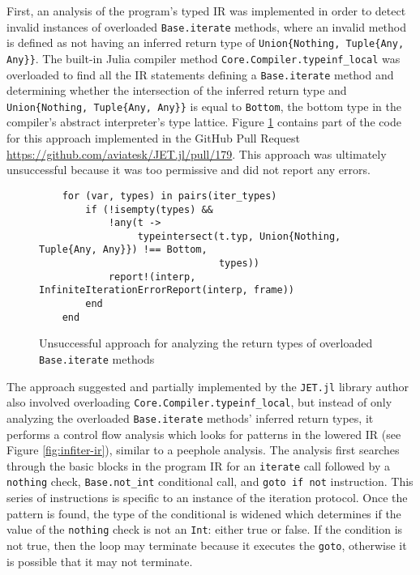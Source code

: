 \documentclass[manuscript, nonacm]{acmart}
\begin{document}
First, an analysis of the program's typed IR was implemented in order to detect invalid instances of overloaded \texttt{Base.iterate} methods, where an invalid method is defined as not having an inferred return type of \verb|Union{Nothing, Tuple{Any, Any}}|. The built-in Julia compiler method \verb|Core.Compiler.typeinf_local| was overloaded to find all the IR statements defining a \texttt{Base.iterate} method and determining whether the intersection of the inferred return type and \verb|Union{Nothing, Tuple{Any, Any}}| is equal to \texttt{Bottom}, the bottom type in the compiler's abstract interpreter's type lattice. Figure \ref{fig:try1} contains part of the code for this approach implemented in the GitHub Pull Request \url{https://github.com/aviatesk/JET.jl/pull/179}. This approach was ultimately unsuccessful because it was too permissive and did not report any errors.

\begin{figure}
    \begin{verbatim}
    for (var, types) in pairs(iter_types)
        if (!isempty(types) &&
            !any(t ->
                 typeintersect(t.typ, Union{Nothing, Tuple{Any, Any}}) !== Bottom,
                               types))
            report!(interp, InfiniteIterationErrorReport(interp, frame))
        end
    end
    \end{verbatim}
    \caption{Unsuccessful approach for analyzing the return types of overloaded \texttt{Base.iterate} methods}
    \label{fig:try1}
\end{figure}

The approach suggested and partially implemented by the \texttt{JET.jl} library author \cite{infinite-iteration-pr} also involved overloading \verb|Core.Compiler.typeinf_local|, but instead of only analyzing the overloaded \texttt{Base.iterate} methods' inferred return types, it performs a control flow analysis which looks for patterns in the lowered IR (see Figure \ref{fig:infiter-ir}), similar to a peephole analysis. The analysis first searches through the basic blocks in the program IR for an \texttt{iterate} call followed by a \texttt{nothing} check, \verb|Base.not_int| conditional call, and \verb|goto if not| instruction. This series of instructions is specific to an instance of the iteration protocol. Once the pattern is found, the type of the conditional is widened which determines if the value of the \texttt{nothing} check is not an \texttt{Int}: either true or false. If the condition is not true, then the loop may terminate because it executes the \texttt{goto}, otherwise it is possible that it may not terminate.
\end{document}
